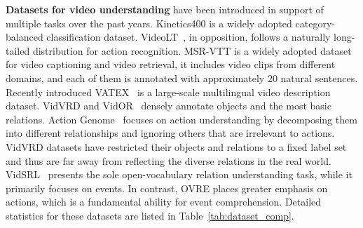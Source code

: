 \documentclass[letterpaper]{article}
\begin{document}
\noindent \textbf{Datasets for video understanding} have been introduced in support of multiple tasks over the past years.
Kinetics400 \cite{Kay2017TheKH} is a widely adopted category-balanced classification dataset. VideoLT~\cite{zhang2021videolt}, in opposition, follows a naturally long-tailed distribution for action recognition.
MSR-VTT \cite{7780940} is a widely adopted dataset for video captioning and video retrieval, it includes video clips from different domains, and each of them is annotated with approximately 20 natural sentences. Recently introduced VATEX~\cite{wang2019vatex} is a large-scale multilingual video description dataset.
VidVRD \cite{Shang2017VideoVR} and VidOR~\cite{shang2019annotating} densely annotate objects and the most basic relations.
Action Genome~\cite{genome} focuses on action understanding by decomposing them into different relationships and ignoring others that are irrelevant to actions.
VidVRD datasets have restricted their objects and relations to a fixed label set and thus are far away from reflecting the diverse relations in the real world.
VidSRL~\cite{sadhu2021visual} presents the sole open-vocabulary relation understanding task, while it primarily focuses on events. In contrast, OVRE places greater emphasis on actions, which is a fundamental ability for event comprehension.
Detailed statistics for these datasets are listed in Table~\ref{tab:dataset_comp}.


%
%
\end{document}
